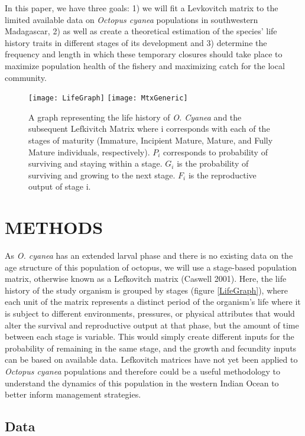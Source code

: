 \documentclass[
]{article}
\begin{document}
In this paper, we have three goals: 1) we will fit a Levkovitch matrix to the limited available data on \emph{Octopus cyanea} populations in southwestern Madagascar, 2) as well as create a theoretical estimation of the species' life history traits in different stages of its development and 3) determine the frequency and length in which these temporary closures should take place to maximize population health of the fishery and maximizing catch for the local community.



\begin{figure}
\texttt{[image: LifeGraph]} \texttt{[image: MtxGeneric]} \caption{A graph representing the life history of \emph{O. Cyanea} and the subsequent Lefkivitch Matrix where i corresponds with each of the stages of maturity (Immature, Incipient Mature, Mature, and Fully Mature individuals, respectively). \(P_i\) corresponds to probability of surviving and staying within a stage. \(G_i\) is the probability of surviving and growing to the next stage. \(F_i\) is the reproductive output of stage i. \label{LifeGraph}}\label{fig:LifeGraph}
\end{figure}

\hypertarget{methods}{%
\section{METHODS}\label{methods}}

As \emph{O. cyanea} has an extended larval phase and there is no existing data on the age structure of this population of octopus, we will use a stage-based population matrix, otherwise known as a Lefkovitch matrix (Caswell 2001). Here, the life history of the study organism is grouped by stages (figure \ref{LifeGraph}), where each unit of the matrix represents a distinct period of the organism's life where it is subject to different environments, pressures, or physical attributes that would alter the survival and reproductive output at that phase, but the amount of time between each stage is variable. This would simply create different inputs for the probability of remaining in the same stage, and the growth and fecundity inputs can be based on available data. Lefkovitch matrices have not yet been applied to \emph{Octopus cyanea} populations and therefore could be a useful methodology to understand the dynamics of this population in the western Indian Ocean to better inform management strategies.

\hypertarget{data}{%
\subsection{Data}\label{data}}
\end{document}

